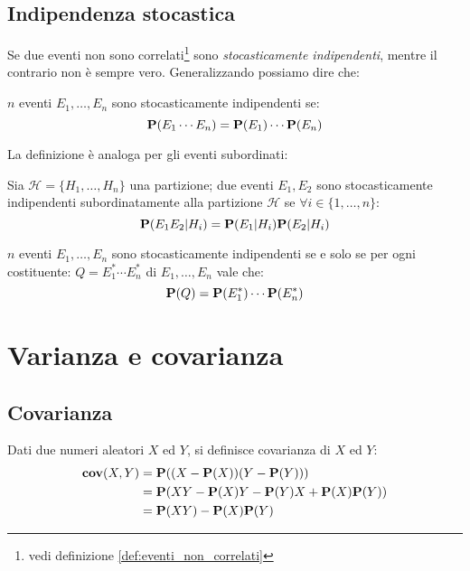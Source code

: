 \subsection{Indipendenza stocastica} %
Se due eventi non sono correlati\footnote{vedi definizione \ref{def:eventi_non_correlati}} sono \emph{stocasticamente indipendenti}, mentre il contrario non è sempre vero.
Generalizzando possiamo dire che:
\begin{definition}
  \label{def:indipendenza_stocastica}
  $n$ eventi \( E_1, \ldots, E_n \) sono stocasticamente indipendenti se:
  \[ \mathbf{P}(E_1 \cdots E_n) = \mathbf{P}(E_1) \cdots \mathbf{P}(E_n) \]
\end{definition}

La definizione è analoga per gli eventi subordinati:
\begin{definition}
  Sia \( \mathcal{H} = \{ H_1, \ldots, H_n \} \) una partizione; due eventi \( E_1, E_2 \) sono stocasticamente indipendenti subordinatamente alla partizione \( \mathcal{H} \) se \( \forall i \in \{1,\ldots,n\} \):
  \[ \mathbf{P}(E_1 E_2 | H_i) = \mathbf{P}(E_1 | H_i)\mathbf{P}(E_2|H_i) \]
\end{definition}

\begin{definition}
  $n$ eventi \( E_1, \ldots, E_n \) sono stocasticamente indipendenti se e solo se per ogni costituente:
  \( Q = E_1^* \cdots E_n^* \) di \( E_1, \ldots, E_n \) vale che:
  \[ \mathbf{P}(Q) = \mathbf{P}(E_1^*) \cdots \mathbf{P}(E_n^*) \]
\end{definition}


\section{Varianza e covarianza} %
\subsection{Covarianza} %
\begin{definition}[Covarianza]\label{def:covarianza}
  Dati due numeri aleatori $X$ ed $Y$, si definisce covarianza di $X$ ed $Y$:
  \begin{align*}
    \mathbf{cov}(X,Y) &= \mathbf{P}((X - \mathbf{P}(X))(Y - \mathbf{P}(Y))) \\
    &= \mathbf{P}(XY - \mathbf{P}(X)Y - \mathbf{P}(Y)X + \mathbf{P}(X)\mathbf{P}(Y)) \\
    &= \mathbf{P}(XY) - \mathbf{P}(X)\mathbf{P}(Y)
  \end{align*}
\end{definition}

